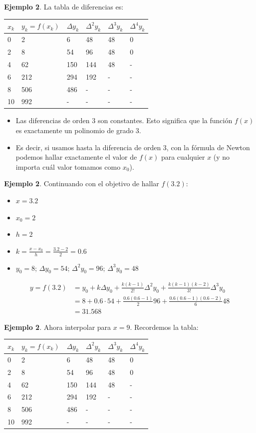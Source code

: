 \documentclass[]{book}
\providecommand{\tightlist}{%
  \setlength{\itemsep}{0pt}\setlength{\parskip}{0pt}}
\begin{document}
\textbf{Ejemplo 2}. La tabla de diferencias es:

\begin{longtable}[]{@{}llllll@{}}
\toprule
\(x_k\) & \(y_k=f(x_k)\) & \(\Delta y_k\) & \(\Delta^2 y_k\) & \(\Delta^3 y_k\) & \(\Delta^4 y_k\)\tabularnewline
\midrule
\endhead
0 & 2 & 6 & 48 & 48 & 0\tabularnewline
2 & 8 & 54 & 96 & 48 & 0\tabularnewline
4 & 62 & 150 & 144 & 48 & -\tabularnewline
6 & 212 & 294 & 192 & - & -\tabularnewline
8 & 506 & 486 & - & - & -\tabularnewline
10 & 992 & - & - & - & -\tabularnewline
\bottomrule
\end{longtable}

\begin{itemize}
\tightlist
\item
  Las diferencias de orden 3 son constantes. Esto significa que la función \(f(x)\) es exactamente un polinomio de grado 3.
\item
  Es decir, si usamos hasta la diferencia de orden 3, con la fórmula de Newton podemos hallar exactamente el valor de \(f(x)\) para cualquier \(x\) (y no importa cuál valor tomamos como \(x_0\)).
\end{itemize}

\textbf{Ejemplo 2}. Continuando con el objetivo de hallar \(f(3.2)\):

\begin{itemize}
\tightlist
\item
  \(x = 3.2\)
\item
  \(x_0 = 2\)
\item
  \(h = 2\)
\item
  \(k = \frac{x-x_0}{h} = \frac{3.2-2}{2} = 0.6\)
\item
  \(y_0 = 8\); \(\Delta y_0 = 54\); \(\Delta^2 y_0 = 96\); \(\Delta^3 y_0 = 48\)
\end{itemize}

\[
\begin{aligned}
y = f(3.2) &= y_0 + k \Delta y_0 + \frac{k(k-1)}{2!}\Delta^2 y_0 + \frac{k(k-1)(k-2)}{3!}\Delta^3 y_0\\
  & = 8 + 0.6 \cdot 54 + \frac{0.6 (0.6-1)}{2} 96 + \frac{0.6 (0.6-1)(0.6-2)}{6} 48 \\
  & = 31.568
\end{aligned}
\]

\textbf{Ejemplo 2}. Ahora interpolar para \(x = 9\). Recordemos la tabla:

\begin{longtable}[]{@{}llllll@{}}
\toprule
\(x_k\) & \(y_k=f(x_k)\) & \(\Delta y_k\) & \(\Delta^2 y_k\) & \(\Delta^3 y_k\) & \(\Delta^4 y_k\)\tabularnewline
\midrule
\endhead
0 & 2 & 6 & 48 & 48 & 0\tabularnewline
2 & 8 & 54 & 96 & 48 & 0\tabularnewline
4 & 62 & 150 & 144 & 48 & -\tabularnewline
6 & 212 & 294 & 192 & - & -\tabularnewline
8 & 506 & 486 & - & - & -\tabularnewline
10 & 992 & - & - & - & -\tabularnewline
\bottomrule
\end{longtable}
\end{document}
